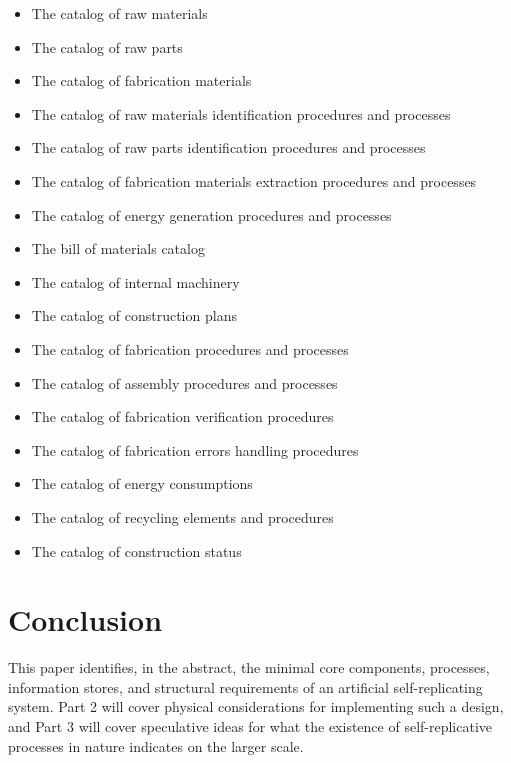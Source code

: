 \begin{itemize}
\item The catalog of raw materials
\item The catalog of raw parts
\item The catalog of fabrication materials
\item The catalog of raw materials identification procedures and
processes
\item The catalog of raw parts identification procedures and processes
\item The catalog of fabrication materials extraction procedures and
processes
\item The catalog of energy generation procedures and processes
\item The bill of materials catalog
\item The catalog of internal machinery
\item The catalog of construction plans
\item The catalog of fabrication procedures and processes
\item The catalog of assembly procedures and processes
\item The catalog of fabrication verification procedures
\item The catalog of fabrication errors handling procedures
\item The catalog of energy consumptions
\item The catalog of recycling elements and procedures
\item The catalog of construction status
\end{itemize}

\section{Conclusion}

This paper identifies, in the abstract, the minimal core components,
processes, information stores, and structural requirements of an artificial 
self-replicating system.  Part 2 will cover physical considerations for
implementing such a design, and Part 3 will cover speculative ideas for
what the existence of self-replicative processes in nature indicates on the
larger scale.
